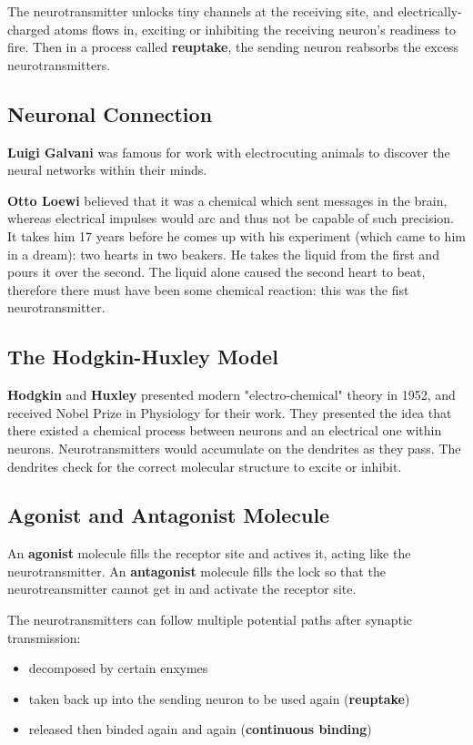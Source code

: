 \documentclass[12pt]{article}
\begin{document}
The neurotransmitter unlocks tiny channels at the receiving site, and electrically-charged atoms flows in, exciting or inhibiting the receiving neuron's readiness to fire. Then in a process called \textbf{reuptake}, the sending neuron reabsorbs the excess neurotransmitters.

\subsection*{Neuronal Connection}
{\bf Luigi Galvani} was famous for work with electrocuting animals to discover the neural networks within their minds.

{\bf Otto Loewi} believed that it was a chemical which sent messages in the brain, whereas electrical impulses would arc and thus not be capable of such precision. It takes him 17 years before he comes up with his experiment (which came to him in a dream): two hearts in two beakers. He takes the liquid from the first and pours it over the second. The liquid alone caused the second heart to beat, therefore there must have been some chemical reaction: this was the fist neurotransmitter.

\subsection*{The Hodgkin-Huxley Model}
{\bf Hodgkin} and {\bf Huxley} presented modern "electro-chemical" theory in 1952, and received Nobel Prize in Physiology for their work. They presented the idea that there existed a chemical process between neurons and an electrical one within neurons. Neurotransmitters would accumulate on the dendrites as they pass. The dendrites check for the correct molecular structure to excite or inhibit.

\subsection*{Agonist and Antagonist Molecule}
An \textbf{agonist} molecule fills the receptor site and actives it, acting like the neurotransmitter. An \textbf{antagonist} molecule fills the lock so that the neurotreansmitter cannot get in and activate the receptor site.

The neurotransmitters can follow multiple potential paths after synaptic transmission:
\begin{itemize}
\item decomposed by certain enxymes
\item taken back up into the sending neuron to be used again ({\bf reuptake})
\item released then binded again and again ({\bf continuous binding})
\end{itemize}
\end{document}
